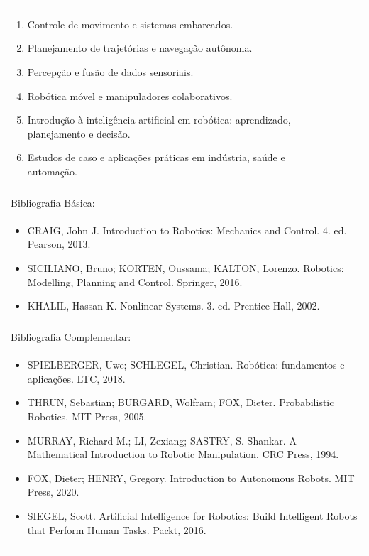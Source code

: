 \documentclass[11pt]{article}
\begin{document}
\begin{center}
\begin{longtable}{|p{4cm}|p{4cm}|p{4cm}|p{4cm}|}
{\begin{enumerate}
\item Controle de movimento e sistemas embarcados.
\item Planejamento de trajetórias e navegação autônoma.
\item Percepção e fusão de dados sensoriais.
\item Robótica móvel e manipuladores colaborativos.
\item Introdução à inteligência artificial em robótica: aprendizado, planejamento e decisão.
\item Estudos de caso e aplicações práticas em indústria, saúde e automação.\end{enumerate}}\\
\multicolumn{4}{|p{16cm}|}{}\\
\hline
\multicolumn{4}{|p{16cm}|}{Bibliografia Básica:}\\
\multicolumn{4}{|p{\dimexpr 16cm + 6\tabcolsep\relax}|}{%
\begin{itemize}\item CRAIG, John J. Introduction to Robotics: Mechanics and Control. 4. ed. Pearson, 2013.
\item SICILIANO, Bruno; KORTEN, Oussama; KALTON, Lorenzo. Robotics: Modelling, Planning and Control. Springer, 2016.
\item KHALIL, Hassan K. Nonlinear Systems. 3. ed. Prentice Hall, 2002.\end{itemize}}\\
\multicolumn{4}{|p{16cm}|}{}\\
\hline
\multicolumn{4}{|p{16cm}|}{Bibliografia Complementar:}\\
\multicolumn{4}{|p{\dimexpr 16cm + 6\tabcolsep\relax}|}{%
\begin{itemize}\item SPIELBERGER, Uwe; SCHLEGEL, Christian. Robótica: fundamentos e aplicações. LTC, 2018.
\item THRUN, Sebastian; BURGARD, Wolfram; FOX, Dieter. Probabilistic Robotics. MIT Press, 2005.
\item MURRAY, Richard M.; LI, Zexiang; SASTRY, S. Shankar. A Mathematical Introduction to Robotic Manipulation. CRC Press, 1994.
\item FOX, Dieter; HENRY, Gregory. Introduction to Autonomous Robots. MIT Press, 2020.
\item SIEGEL, Scott. Artificial Intelligence for Robotics: Build Intelligent Robots that Perform Human Tasks. Packt, 2016.\end{itemize}}\\
\hline
\end{longtable}
\end{center}
\end{document}
